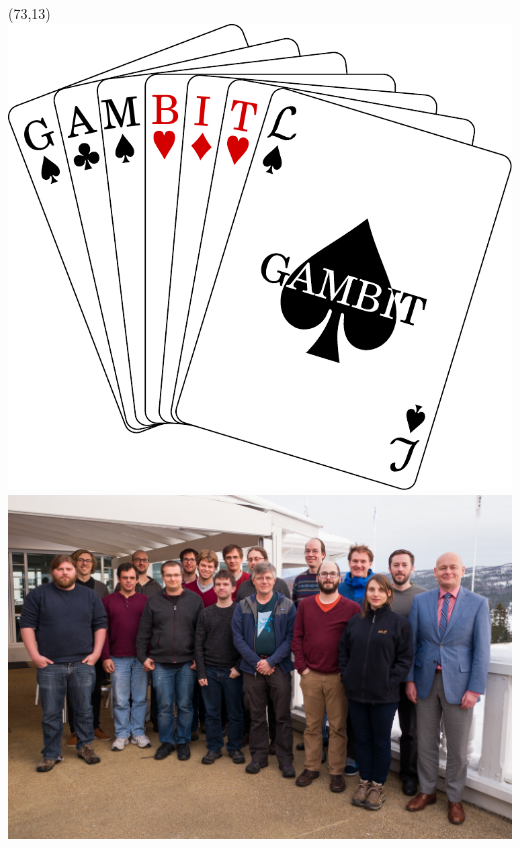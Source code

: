 \documentclass[xcolor=dvipsnames]{beamer}
\begin{document}
\begin{frame}
\begin{textblock}{45}(73,13)
  \includegraphics[width=\linewidth]{Logo2full}\\	
  \includegraphics[width=\linewidth]{GroupPhoto}
\end{textblock}

\end{frame}
\end{document}
